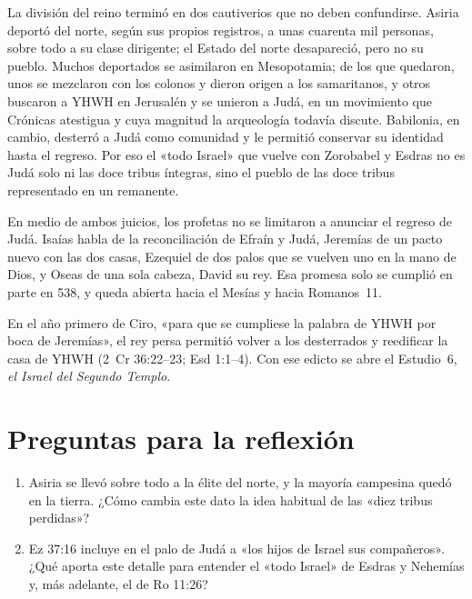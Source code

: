 La división del reino terminó en dos cautiverios que no deben confundirse. Asiria deportó del norte, según sus propios registros, a unas cuarenta mil personas, sobre todo a su clase dirigente; el Estado del norte desapareció, pero no su pueblo. Muchos deportados se asimilaron en Mesopotamia; de los que quedaron, unos se mezclaron con los colonos y dieron origen a los samaritanos, y otros buscaron a YHWH en Jerusalén y se unieron a Judá, en un movimiento que Crónicas atestigua y cuya magnitud la arqueología todavía discute. Babilonia, en cambio, desterró a Judá como comunidad y le permitió conservar su identidad hasta el regreso. Por eso el «todo Israel» que vuelve con Zorobabel y Esdras no es Judá solo ni las doce tribus íntegras, sino el pueblo de las doce tribus representado en un remanente.

En medio de ambos juicios, los profetas no se limitaron a anunciar el regreso de Judá. Isaías habla de la reconciliación de Efraín y Judá, Jeremías de un pacto nuevo con las dos casas, Ezequiel de dos palos que se vuelven uno en la mano de Dios, y Oseas de una sola cabeza, David su rey. Esa promesa solo se cumplió en parte en 538, y queda abierta hacia el Mesías y hacia Romanos~11.

En el año primero de Ciro, «para que se cumpliese la palabra de YHWH por boca de Jeremías», el rey persa permitió volver a los desterrados y reedificar la casa de YHWH (2~Cr 36:22--23; Esd 1:1--4). Con ese edicto se abre el Estudio~6, \emph{el Israel del Segundo Templo}.

\section*{Preguntas para la reflexión}
\begin{enumerate}
\item Asiria se llevó sobre todo a la élite del norte, y la mayoría campesina quedó en la tierra. ¿Cómo cambia este dato la idea habitual de las «diez tribus perdidas»?
\item Ez 37:16 incluye en el palo de Judá a «los hijos de Israel sus compañeros». ¿Qué aporta este detalle para entender el «todo Israel» de Esdras y Nehemías y, más adelante, el de Ro 11:26?
\end{enumerate}


